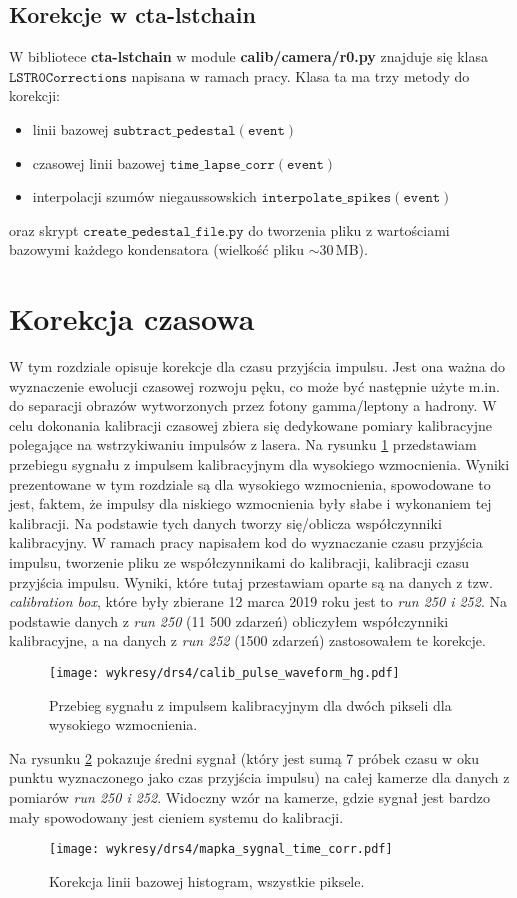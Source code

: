 \documentclass[a4paper,11pt,twoside]{article}
\begin{document}
\subsection{Korekcje w cta-lstchain}
W bibliotece {\bf{cta-lstchain}} w module {\bf{calib/camera/r0.py}} znajduje się klasa $\mathtt{LSTR0Corrections}$ napisana w ramach pracy. Klasa ta ma trzy metody do korekcji:
\begin{itemize}
\item linii bazowej $\mathtt{subtract\_pedestal(event)}$
\item czasowej linii bazowej $\mathtt{time\_lapse\_corr(event)}$
\item interpolacji szumów niegaussowskich $\mathtt{interpolate\_spikes(event)}$
\end{itemize}
oraz skrypt $\mathtt{create\_pedestal\_file.py}$ do tworzenia pliku z wartościami bazowymi każdego kondensatora (wielkość pliku $\sim$30\,MB).
\newpage
\section{Korekcja czasowa}
W tym rozdziale opisuje korekcje dla czasu przyjścia impulsu. Jest ona ważna do wyznaczenie ewolucji czasowej rozwoju pęku, co może być następnie użyte m.in. do separacji obrazów wytworzonych przez fotony gamma/leptony a hadrony. 
W celu dokonania kalibracji czasowej zbiera się dedykowane pomiary kalibracyjne polegające na wstrzykiwaniu impulsów z lasera. Na rysunku \ref{fig:calib_waveform_hg} przedstawiam przebiegu sygnału z impulsem kalibracyjnym dla wysokiego wzmocnienia. Wyniki prezentowane w tym rozdziale są dla wysokiego wzmocnienia, spowodowane to jest, faktem, że impulsy dla niskiego wzmocnienia były słabe i wykonaniem tej kalibracji.  Na podstawie tych danych tworzy się/oblicza współczynniki kalibracyjny. W ramach pracy napisałem kod do wyznaczanie czasu przyjścia impulsu, tworzenie pliku ze współczynnikami do kalibracji, kalibracji czasu przyjścia impulsu. Wyniki, które tutaj przestawiam oparte są na danych z tzw. \textsl{calibration box}, które były zbierane 12 marca 2019 roku jest to \textsl{run 250 i 252}. Na podstawie danych z \textsl{run 250} (11 500 zdarzeń) obliczyłem współczynniki kalibracyjne, a na danych z \textsl{run 252} (1500 zdarzeń) zastosowałem te korekcje. 
\begin{figure}[H] 
\centering
\texttt{[image: wykresy/drs4/calib\_pulse\_waveform\_hg.pdf]}
\caption{Przebieg sygnału z impulsem kalibracyjnym dla dwóch pikseli dla wysokiego wzmocnienia.}
\label{fig:calib_waveform_hg}
\end{figure}
Na rysunku \ref{fig:signal_map} pokazuje średni sygnał (który jest sumą 7 próbek czasu w oku punktu wyznaczonego jako czas przyjścia impulsu) na całej kamerze dla danych z pomiarów \textsl{run 250 i 252}. Widoczny wzór na kamerze, gdzie sygnał jest bardzo mały spowodowany jest cieniem systemu do kalibracji.
\begin{figure}[H] 
\centering
\texttt{[image: wykresy/drs4/mapka\_sygnal\_time\_corr.pdf]}
\caption{Korekcja linii bazowej histogram, wszystkie piksele.}
\label{fig:signal_map}
\end{figure}
\end{document}
